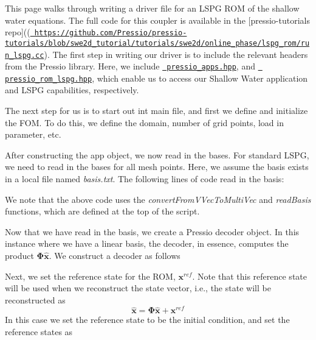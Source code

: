 This page walks through writing a driver file for an L\+S\+PG R\+OM of the shallow water equations. The full code for this coupler is available in the \mbox{[}pressio-\/tutorials repo\mbox{]}((\href{https://github.com/Pressio/pressio-tutorials/blob/swe2d_tutorial/tutorials/swe2d/online_phase/lspg_rom/run_lspg.cc}{\texttt{ https\+://github.\+com/\+Pressio/pressio-\/tutorials/blob/swe2d\+\_\+tutorial/tutorials/swe2d/online\+\_\+phase/lspg\+\_\+rom/run\+\_\+lspg.\+cc}}). The first step in writing our driver is to include the relevant headers from the Pressio library. Here, we include \href{https://github.com/Pressio/pressio/blob/master/packages/pressio_apps.hpp}{\texttt{ pressio\+\_\+apps.\+hpp}}, and \href{https://github.com/Pressio/pressio/blob/master/packages/pressio_lspg.hpp}{\texttt{ pressio\+\_\+rom\+\_\+lspg.\+hpp}}, which enable us to access our Shallow Water application and L\+S\+PG capabilities, respectively. 
\begin{DoxyCode}{0}
\end{DoxyCode}


The next step for us is to start out int main file, and first we define and initialize the F\+OM. To do this, we define the domain, number of grid points, load in parameter, etc.


\begin{DoxyCode}{0}
\end{DoxyCode}


After constructing the app object, we now read in the bases. For standard L\+S\+PG, we need to read in the bases for all mesh points. Here, we assume the basis exists in a local file named {\itshape basis.\+txt}. The following lines of code read in the basis\+:


\begin{DoxyCode}{0}
\end{DoxyCode}


We note that the above code uses the {\itshape convert\+From\+V\+Vec\+To\+Multi\+Vec} and {\itshape read\+Basis} functions, which are defined at the top of the script.

Now that we have read in the basis, we create a Pressio decoder object. In this instance where we have a linear basis, the decoder, in essence, computes the product $\boldsymbol \Phi \hat{\boldsymbol x} $. We construct a decoder as follows 
\begin{DoxyCode}{0}
\end{DoxyCode}


Next, we set the reference state for the R\+OM, $\boldsymbol x^{ref}$. Note that this reference state will be used when we reconstruct the state vector, i.\+e., the state will be reconstructed as \[\hat{ \boldsymbol x} = \boldsymbol \Phi \hat{\boldsymbol x} + \boldsymbol x^{ref}\] In this case we set the reference state to be the initial condition, and set the reference states as 
\begin{DoxyCode}{0}
\end{DoxyCode}


